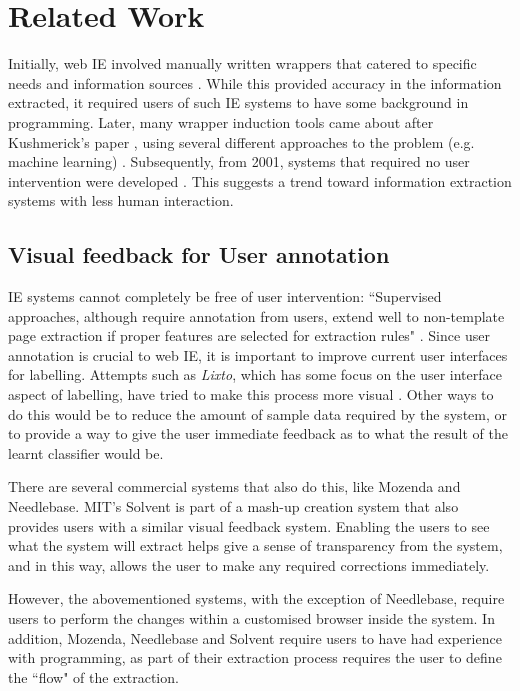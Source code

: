 \chapter{Related Work}
\label{chap:relatedwork}
Initially, web IE involved manually written wrappers that catered to specific needs and
information sources \cite{Chawathe1994,Perkowitz1995}. While this provided accuracy in the
information extracted, it required users of such IE systems to have some background in
programming. Later, many wrapper induction tools came about after Kushmerick's paper
\cite{Kushmerick1997}, using several different approaches to the problem (e.g. machine
learning) \cite{Freitag1998,Soderland}. Subsequently, from 2001, systems that required no user
intervention were developed \cite{Chang2001,Crescenzi2002,Arasu2003}. This suggests a trend
toward information extraction systems with less human interaction.
\section{Visual feedback for User annotation}
IE systems cannot completely be free of user intervention: ``Supervised approaches,
although require annotation from users, extend well to non-template page extraction if proper
features are selected for extraction rules" \cite{Kayed2006}. Since user annotation is crucial
to web IE, it is important to improve current user interfaces for labelling. Attempts such as
\textit{Lixto}, which has some focus on the user interface aspect of labelling, have tried to
make this process more visual \cite{Baumgartner2001}. Other ways to do this would be to reduce
the amount of sample data required by the system, or to provide a way to give the user
immediate feedback as to what the result of the learnt classifier would be.

There are several commercial systems that also do this, like Mozenda and Needlebase. %
MIT's Solvent is part of a mash-up creation system that also provides users with a similar
visual feedback system. Enabling the users to see what the system will extract helps give a
sense of transparency from the system, and in this way, allows the user to make any required
corrections immediately.

However, the abovementioned systems, with the exception of Needlebase, require users to perform
the changes within a customised browser inside the system. In addition, Mozenda, Needlebase and
Solvent require users to have had experience with programming, as part of their extraction
process requires the user to define the ``flow" of the extraction.

